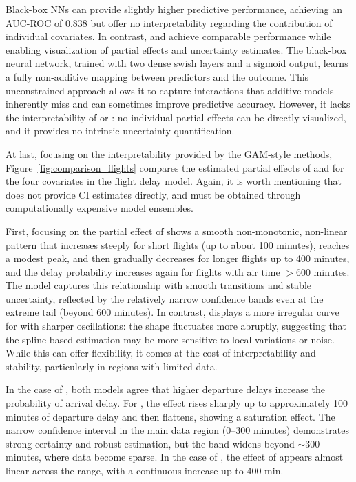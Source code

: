 Black-box NNs can provide slightly higher predictive performance, achieving an AUC-ROC of $0.838$ but offer no interpretability regarding the contribution of individual covariates. In contrast,  and  achieve comparable performance while enabling visualization of partial effects and uncertainty estimates. The black-box neural network, trained with two dense swish layers and a sigmoid output, learns a fully non-additive mapping between predictors and the outcome. This unconstrained approach allows it to capture interactions that additive models inherently miss and can sometimes improve predictive accuracy. However, it lacks the interpretability of  or : no individual partial effects can be directly visualized, and it provides no intrinsic uncertainty quantification.

At last, focusing on the interpretability provided by the GAM-style methods, Figure~\ref{fig:comparison_flights} compares the estimated partial effects of  and  for the four covariates in the flight delay model. Again, it is worth mentioning that  does not provide CI estimates directly, and must be obtained through computationally expensive model ensembles.

First, focusing on the partial effect of   shows a smooth non-monotonic, non-linear pattern that increases steeply for short flights (up to about 100 minutes), reaches a modest peak, and then gradually decreases for longer flights up to 400 minutes, and the delay probability increases again for flights with air time $>600$ minutes. The model captures this relationship with smooth transitions and stable uncertainty, reflected by the relatively narrow confidence bands even at the extreme tail (beyond 600 minutes). In contrast,  displays a more irregular curve for  with sharper oscillations: the shape fluctuates more abruptly, suggesting that the spline-based estimation may be more sensitive to local variations or noise. While this can offer flexibility, it comes at the cost of interpretability and stability, particularly in regions with limited data.

In the case of , both models agree that higher departure delays increase the probability of arrival delay.
For , the effect rises sharply up to approximately 100 minutes of departure delay and then flattens, showing a saturation effect. The narrow confidence interval in the main data region (0–300 minutes) demonstrates strong certainty and robust estimation, but the band widens beyond $\sim 300$ minutes, where data become sparse. In the case of , the effect of  appears almost linear across the range, with a continuous increase up to 400 min.

